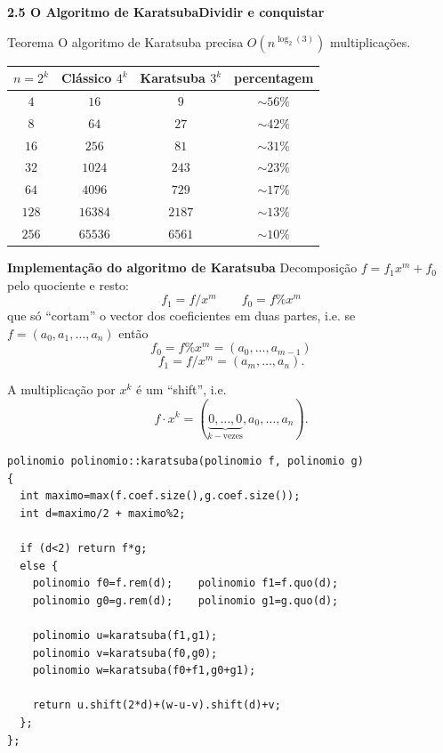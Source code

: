 \documentclass{beamer}
\begin{document}
\begin{frame}[fragile]{\bf 2.5 O Algoritmo de Karatsuba}{\bf Dividir e conquistar}
\begin{block}{Teorema}
O algoritmo de Karatsuba precisa $O(n^{\log_2(3)})$ multiplicações.
\end{block}\pause

\medskip

\begin{tabular}{|c|c|c|c|}\hline
$n=2^k$ & Clássico $4^k$& Karatsuba $3^k$ & percentagem \\\hline
$4$ & $16$ & $9$ & $\sim 56\%$\\\hline
$8$ & $64$ & $27$ & $\sim 42\%$ \\\hline
$16$ & $256$ & $81$ & $\sim 31\%$\\\hline
$32$ & $1024$ & $243$ & $\sim 23\%$\\\hline
$64$ & $4096$ & $729$ & $\sim 17\%$\\\hline
$128$ & $16384$ & $2187$ & $\sim 13\%$ \\\hline
$256$ & $65536$ & $6561$ & $\sim 10\%$\\\hline
\end{tabular}
\end{frame}

\begin{frame}{\bf Implementação do algoritmo de Karatsuba}
Decomposição $f=f_1 x^m + f_0$ pelo quociente e resto:
$$ f_1 = f / x^m \qquad f_0 = f \% x^m$$
que só ``cortam'' o vector dos coeficientes em duas partes, i.e. se 
$f=(a_0, a_1, \ldots, a_ n)$ então 
$$f_0 = f\%x^m = (a_0, \ldots, a_{m-1})$$
$$f_1 = f/x^m = (a_m, \ldots, a_n).$$

A multiplicação por $x^k$ é um ``shift'', i.e. 
$$f\cdot x^k = (\underbrace{0, \ldots, 0}_{k-\mbox{vezes}}, a_0, \ldots, a_n).$$
\end{frame}
\begin{frame}[fragile]
\lstset{language=C++}%
\begin{lstlisting}
polinomio polinomio::karatsuba(polinomio f, polinomio g)
{
  int maximo=max(f.coef.size(),g.coef.size());
  int d=maximo/2 + maximo%2;
  
  if (d<2) return f*g;
  else {
    polinomio f0=f.rem(d);    polinomio f1=f.quo(d);
    polinomio g0=g.rem(d);    polinomio g1=g.quo(d);

    polinomio u=karatsuba(f1,g1);
    polinomio v=karatsuba(f0,g0);
    polinomio w=karatsuba(f0+f1,g0+g1);

    return u.shift(2*d)+(w-u-v).shift(d)+v;
  };
};
\end{lstlisting}
\end{frame}
\end{document}
